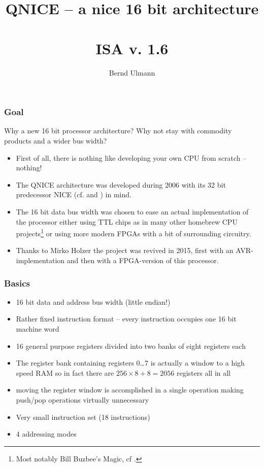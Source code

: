 \documentclass{beamer}
\title{QNICE -- a nice 16 bit architecture\\~\\ISA v. 1.6}
\author{Bernd Ulmann}
\begin{document}
 \begin{frame}
  \titlepage
 \end{frame}
%
   \begin{frame}
    \frametitle{Goal}
    Why a new 16 bit processor architecture? Why not stay with commodity
    products and a wider bus width?
    \begin{itemize}
     \item First of all, there is nothing like developing your own CPU
      from scratch -- nothing!
     \item The QNICE architecture was developed during 2006 with its
      32 bit predecessor NICE (cf. \cite{nice} and \cite{nice_html}) in
      mind. 
     \item The 16 bit data bus width was chosen to ease an actual 
      implementation of the processor either using TTL chips as in many
      other homebrew CPU projects\footnote{Most notably Bill Buzbee's
      Magic, cf \cite{magic}.} or using more modern FPGAs with a bit
      of surrounding circuitry.
     \item Thanks to Mirko Holzer the project was revived in 2015, 
      first with an AVR-implementation and then with a FPGA-version of
      this processor.
    \end{itemize}
   \end{frame}
%
   \begin{frame}
    \frametitle{Basics}
    \begin{itemize}
     \item 16 bit data and address bus width (little endian!)
     \item Rather fixed instruction format -- every instruction occupies
      one 16 bit machine word
     \item 16 general purpose registers divided into two banks of eight
      registers each
     \item The register bank containing registers 0\dots 7 is actually
      a window to a high speed RAM so in fact there are $256\times 8+8=2056$ 
      registers all in all
     \item moving the register window is accomplished in a single operation
      making push/pop operations virtually unnecessary
     \item Very small instruction set (18 instructions)
     \item 4 addressing modes
    \end{itemize}
   \end{frame}
\end{document}
